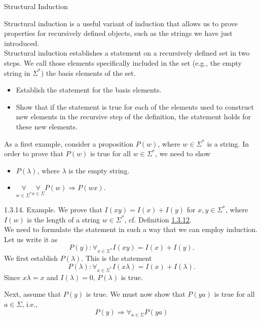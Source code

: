 \documentclass[smaller,hyperref={CJKbookmarks=true}]{beamer}
\begin{document}
\begin{frame}{Structural Induction}
\begin{spacing}{1.1}
\vspace*{10pt}
Structural induction is a useful variant of induction that allows us to prove
properties for recursively defined objects, such as the strings we have just
introduced.\\[5pt]
Structural induction establishes a statement on a recursively defined set in
two steps. We call those elements specifically included in the set (e.g., the
empty string in $\Sigma^*$) the basis elements of the set.
\begin{itemize}
  \item[1.] Establish the statement for the basis elements.
  \item[2.] Show that if the statement is true for each of the elements used to
      construct new elements in the recursive step of the definition, the
      statement holds for these new elements.
\end{itemize}
\end{spacing}
\newpage
\begin{spacing}{1}
As a first example, consider a proposition $P(w)$, where $w\in\Sigma^*$ is a string. In order to prove that $P(w)$ is true for all $w\in\Sigma^*$, we need to show
\begin{itemize}
  \item[1.] $P(\lambda)$, where $\lambda$ is the empty string.
  \item[2.] $\mathop{\forall}\limits_{w\in\Sigma^*}\mathop{\forall}\limits_{x\in\Sigma}P(w)\Rightarrow P(wx).$
\end{itemize}
\alert{1.3.14. Example.} We prove that $I(xy)=I(x)+I(y)$ for $x,y\in\Sigma^*$, where $I(w)$ is the length of a string $w\in\Sigma^*$, cf. Definition \hyperlink{1.3.12}{1.3.12}.\\[4pt]
We need to formulate the statement in such a way that we can employ
induction. Let us write it as
\[P(y)\!:\mathop{\forall}_{x\in\Sigma^*}I(xy)
=I(x)+I(y).\]
We first establish $P(\lambda)$. This is the statement
\[P(\lambda)\!:\mathop{\forall}_{x\in\Sigma^*}I(x\lambda)
=I(x)+I(\lambda).\]
Since $x\lambda=x$ and $I(\lambda)=0,\,P(\lambda)$ is true.
\end{spacing}
\newpage
\begin{spacing}{1.1}
Next, assume that $P(y)$ is true. We must now show that $P(ya)$ is true for all $a\in\Sigma$, i.e.,
\[P(y)\Rightarrow\mathop{\forall}_{a\in\Sigma}P(ya)\]

\end{spacing}
\end{frame}
\end{document}
